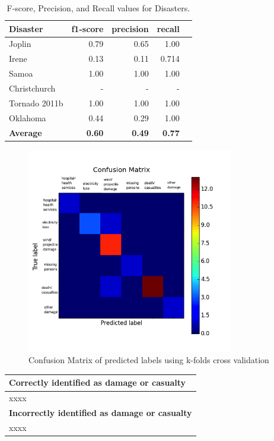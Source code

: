 \documentclass{article}
\begin{document}
\begin{table}
\centering
\small
\begin{tabular}{|l|r|r|r| p{8cm} |}
\hline
{\bf Disaster}  & {\bf f1-score} & {\bf precision} & {\bf recall} \\
\hline
Joplin &  0.79  & 0.65       &  1.00 \\
Irene          &  0.13  &    0.11    &  0.714\\
Samoa        &  1.00  & 1.00   &  1.00\\
Christchurch        &  -  & - & - \\
Tornado 2011b     & 1.00 & 1.00   &  1.00\\
Oklahoma       & 0.44 & 0.29 & 1.00 \\
\hline
{\bf Average}  & {\bf 0.60} & {\bf 0.49}  & {\bf 0.77}  \\
\hline
\end{tabular}
\caption{F-score, Precision, and Recall values for Disasters.}
\label{tab.unseen_disaster}
\end{table}

\begin{figure}[ht!]
\centering
\includegraphics[width=90mm]{confusion_matrix}
\caption{Confusion Matrix of predicted labels using k-folds cross validation}
\label{cm}
\end{figure}


\begin{table}[t]
\centering
\begin{tabular}{|l|}
\hline
{\bf Correctly identified as damage or casualty}\\
\hline
xxxx\\
\hline
{\bf Incorrectly identified as damage or casualty}\\
\hline
xxxx\\
\hline
\end{tabular}
\end{table}
\end{document}
